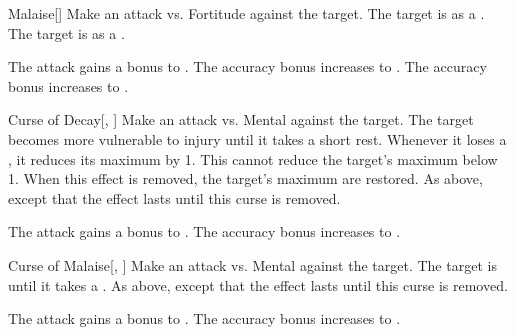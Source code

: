 \lowercase{\hypertarget{spell:Malaise}{}}\label{spell:Malaise}
\begin{freeability}[Rank 1]{\hypertarget{spell:Malaise}{Malaise}}[]
Make an attack vs. Fortitude against the target.
\hit The target is  as a .
\crit The target is  as a .

\rankline
{} The attack gains a  bonus to .
 The accuracy bonus increases to .
 The accuracy bonus increases to .
\end{freeability}
\vspace{0.25em}



\lowercase{\hypertarget{spell:Curse of Decay}{}}\label{spell:Curse of Decay}
\begin{freeability}[Rank 3]{\hypertarget{spell:Curse of Decay}{Curse of Decay}}[, ]
Make an attack vs. Mental against the target.
\hit The target becomes more vulnerable to injury until it takes a short rest.
Whenever it loses a , it reduces its maximum  by 1.
This cannot reduce the target's maximum  below 1.
When this effect is removed, the target's maximum  are restored.
\crit As above, except that the effect lasts until this curse is removed.

\rankline
{} The attack gains a  bonus to .
 The accuracy bonus increases to .
\end{freeability}
\vspace{0.25em}



\lowercase{\hypertarget{spell:Curse of Malaise}{}}\label{spell:Curse of Malaise}
\begin{freeability}[Rank 3]{\hypertarget{spell:Curse of Malaise}{Curse of Malaise}}[, ]
Make an attack vs. Mental against the target.
\hit The target is  until it takes a .
\crit As above, except that the effect lasts until this curse is removed.

\rankline
{} The attack gains a  bonus to .
 The accuracy bonus increases to .
\end{freeability}
\vspace{0.25em}



